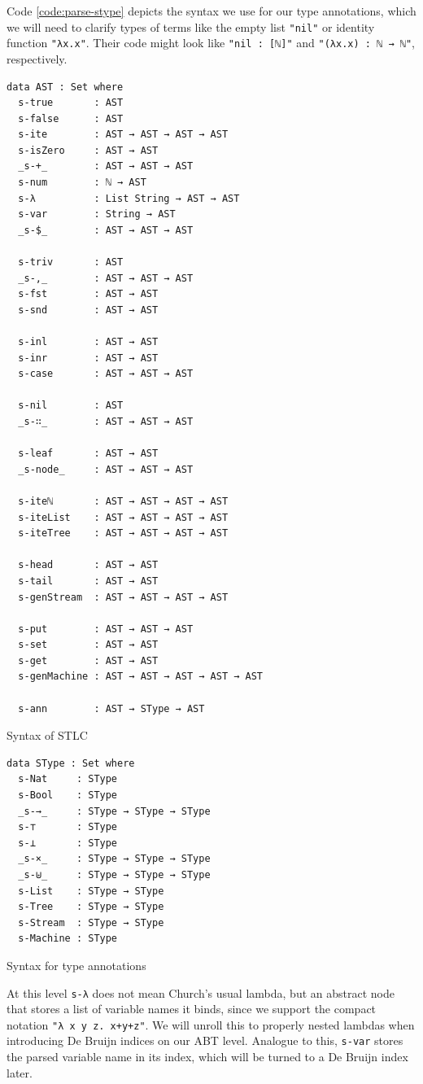 Code \ref{code:parse-stype} depicts the syntax we use for our type annotations, which we will need to clarify types of terms like the empty list \verb$"nil"$ or identity function \verb$"λx.x"$. Their code might look like \verb$"nil : [ℕ]"$ and \verb$"(λx.x) : ℕ → ℕ"$, respectively.

\begin{listing}[H]
\begin{verbatim}
data AST : Set where
  s-true       : AST
  s-false      : AST
  s-ite        : AST → AST → AST → AST
  s-isZero     : AST → AST
  _s-+_        : AST → AST → AST
  s-num        : ℕ → AST
  s-λ          : List String → AST → AST
  s-var        : String → AST
  _s-$_        : AST → AST → AST

  s-triv       : AST
  _s-,_        : AST → AST → AST
  s-fst        : AST → AST
  s-snd        : AST → AST

  s-inl        : AST → AST
  s-inr        : AST → AST
  s-case       : AST → AST → AST

  s-nil        : AST
  _s-∷_        : AST → AST → AST

  s-leaf       : AST → AST
  _s-node_     : AST → AST → AST

  s-iteℕ       : AST → AST → AST → AST
  s-iteList    : AST → AST → AST → AST
  s-iteTree    : AST → AST → AST → AST

  s-head       : AST → AST
  s-tail       : AST → AST
  s-genStream  : AST → AST → AST → AST

  s-put        : AST → AST → AST
  s-set        : AST → AST
  s-get        : AST → AST
  s-genMachine : AST → AST → AST → AST → AST

  s-ann        : AST → SType → AST
\end{verbatim}
\caption{Syntax of STLC}
\label{code:parse-ast}
\end{listing}

\begin{listing}[H]
\begin{verbatim}
data SType : Set where
  s-Nat     : SType
  s-Bool    : SType
  _s-→_     : SType → SType → SType
  s-⊤       : SType
  s-⊥       : SType
  _s-×_     : SType → SType → SType
  _s-⊎_     : SType → SType → SType
  s-List    : SType → SType
  s-Tree    : SType → SType
  s-Stream  : SType → SType
  s-Machine : SType
\end{verbatim}
\caption{Syntax for type annotations}
\label{code:parse-stype}
\end{listing}

At this level \verb$s-λ$ does not mean Church's usual lambda, but an abstract node that stores a list of variable names it binds, since we support the compact notation \verb$"λ x y z. x+y+z"$. We will unroll this to properly nested lambdas when introducing De Bruijn indices \cite{de1972lambda} on our ABT level. Analogue to this, \verb$s-var$ stores the parsed variable name in its index, which will be turned to a De Bruijn index later.

